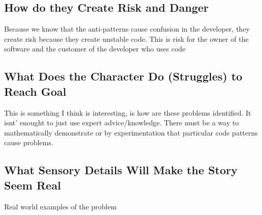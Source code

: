 \documentclass[conference]{IEEEtran}
\begin{document}
\subsection{How do they Create Risk and Danger}
Because we know that the anti-patterns cause confusion in the developer, they create risk because they create unstable code. 
This is risk for the owner of the software and the customer of the developer who uses code
\subsection{What Does the Character Do (Struggles) to Reach Goal}
This is something I think is interesting, is how are these problems identified.
It isnt' enought to just use expert advice/knowledge. 
There must be a way to mathematically demonstrate or by experimentation that particular code patterns cause problems.

\subsection{What Sensory Details Will Make the Story Seem Real}
Real world examples of the problem


\nocite{*}
\clearpage




\end{document}
